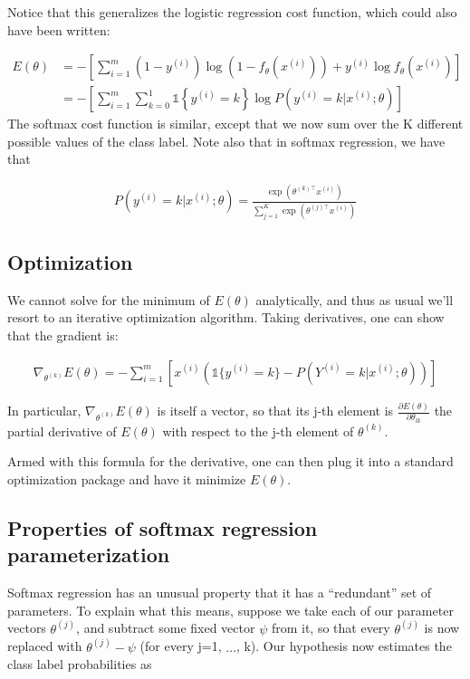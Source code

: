 Notice that this generalizes the logistic regression cost function, which could also have been written:

\begin{align}
	E(\theta) &= - \left[ \sum_{i=1}^m (1-y^{(i)}) \log (1-f_\theta(x^{(i)})) + y^{(i)} \log f_\theta(x^{(i)}) \right] \\ 
			  &= - \left[ \sum_{i=1}^{m} \sum_{k=0}^{1} \mathds{1}\left\{y^{(i)} = k\right\} \log P(y^{(i)} = k | x^{(i)} ; \theta) \right] 
\end{align}
The softmax cost function is similar, except that we now sum over the K different possible values of the class label. Note also that in softmax regression, we have that

\begin{align}
	P(y^{(i)} = k | x^{(i)} ; \theta) = \frac{\exp(\theta^{(k)\top} x^{(i)})}{\sum_{j=1}^K \exp(\theta^{(j)\top} x^{(i)}) }
\end{align}

\subsection{Optimization}

We cannot solve for the minimum of $E(\theta)$ analytically, and thus as usual we’ll resort to an iterative optimization algorithm. Taking derivatives, one can show that the gradient is:

\begin{align} \nabla_{\theta^{(k)}} E(\theta) = - \sum_{i=1}^{m}{ \left[ x^{(i)} \left( \mathds{1} \{ y^{(i)} = k\} - P(Y^{(i)} = k | x^{(i)}; \theta) \right) \right] } \end{align}

In particular, $\nabla_{\theta^{(k)}} E(\theta)$ is itself a vector, so that its j-th element is $\frac{\partial E(\theta)}{\partial \theta_{lk}}$ the partial derivative of $E(\theta)$ with respect to the j-th element of $\theta^{(k)}$.

Armed with this formula for the derivative, one can then plug it into a standard optimization package and have it minimize $E(\theta)$.

\subsection{Properties of softmax regression parameterization}

Softmax regression has an unusual property that it has a “redundant” set of parameters. To explain what this means, suppose we take each of our parameter vectors $\theta^{(j)}$, and subtract some fixed vector $\psi$ from it, so that every $\theta^{(j)}$ is now replaced with $\theta^{(j)} - \psi$ (for every j=1, $\ldots$, k). Our hypothesis now estimates the class label probabilities as


